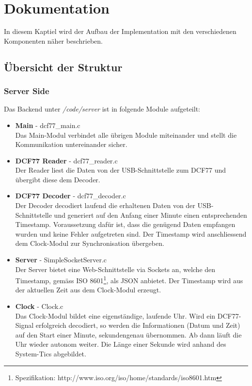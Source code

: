 
\chapter{Dokumentation}
In diesem Kaptiel wird der Aufbau der Implementation mit den verschiedenen Komponenten näher beschrieben.

\section{Übersicht der Struktur}
\subsection{Server Side}
Das Backend unter \textit{/code/server} ist in folgende Module aufgeteilt:
\begin{itemize}
\item {\textbf{Main} - dcf77\_main.c} \\
Das Main-Modul verbindet alle übrigen Module miteinander und stellt die Kommunikation untereinander sicher.
\item {\textbf{DCF77 Reader} - dcf77\_reader.c} \\
Der Reader liest die Daten von der USB-Schnittstelle zum DCF77 und übergibt diese dem Decoder.
\item {\textbf{DCF77 Decoder} - dcf77\_decoder.c}\\
Der Decoder decodiert laufend die erhaltenen Daten von der USB-Schnittstelle und generiert auf den Anfang einer Minute einen entsprechenden Timestamp. Voraussetzung dafür ist, dass die genügend Daten empfangen wurden und keine Fehler aufgetreten sind. Der Timestamp wird anschliessend dem Clock-Modul zur Synchronisation übergeben.
\item {\textbf{Server} - SimpleSocketServer.c}\\
Der Server bietet eine Web-Schnittstelle via Sockets an, welche den Timestamp, gemäss ISO 8601\footnote{Spezifikation: http://www.iso.org/iso/home/standards/iso8601.htm}, als JSON anbietet. Der Timestamp wird aus der aktuellen Zeit aus dem Clock-Modul erzeugt.
\item {\textbf{Clock} - Clock.c}\\
Das Clock-Modul bildet eine eigenständige, laufende Uhr. Wird ein DCF77-Signal erfolgreich decodiert, so werden die Informationen (Datum und Zeit) auf den Start einer Minute, sekundengenau übernommen. Ab dann läuft die Uhr wieder autonom weiter.
Die Länge einer Sekunde wird anhand des System-Tics abgebildet.
\end{itemize} 

